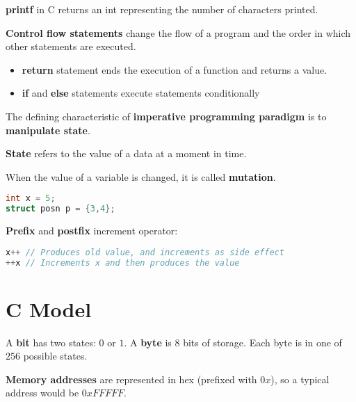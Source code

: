 \documentclass[english, 12pt]{article}
\begin{document}
\begin{defn}
\textbf{printf} in C returns an int representing the number of characters printed.
\end{defn}

\begin{defn}
\textbf{Control flow statements} change the flow of a program and the order in which other statements are executed.
\begin{itemize}
\item \textbf{return} statement ends the execution of a function and returns a value.
\item \textbf{if} and \textbf{else} statements execute statements conditionally
\end{itemize}
\end{defn}
\begin{qte}
The defining characteristic of \textbf{imperative programming paradigm} is to \textbf{manipulate state}.
\end{qte}

\begin{defn}
\textbf{State} refers to the value of a data at a moment in time.
\end{defn}

\begin{defn}
When the value of a variable is changed, it is called \textbf{mutation}.
\begin{lstlisting}[language=C]
int x = 5;
struct posn p = {3,4};
\end{lstlisting}
\end{defn}
\begin{defn}
\textbf{Prefix} and \textbf{postfix} increment operator:
\begin{lstlisting}[language=C]
x++ // Produces old value, and increments as side effect
++x // Increments x and then produces the value
\end{lstlisting}
\end{defn}

\section{C Model}

\begin{defn}
A \textbf{bit} has two states: $0$ or $1$. A \textbf{byte} is $8$ bits of storage. Each byte is in one of $256$ possible states.
\end{defn}


\begin{defn}
\textbf{Memory addresses} are represented in hex (prefixed with $0x$), so a typical address would be $0xFFFFF$.
\end{defn}
\end{document}
